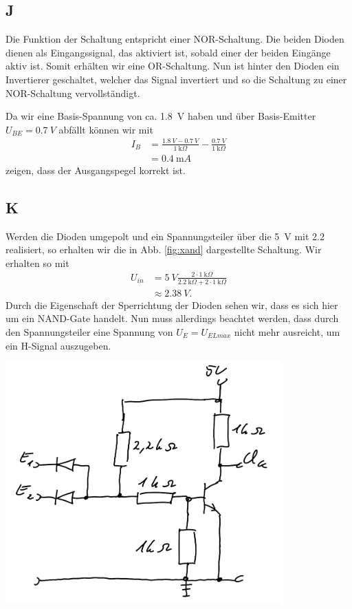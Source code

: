 \documentclass[10pt]{article}
\newenvironment{Figure}
  {\par\medskip\noindent\minipage{\linewidth}}
  {\endminipage\par\medskip}
\begin{document}
\begin{multicols}{2}
	\subsection*{J}
	Die Funktion der Schaltung entspricht einer NOR-Schaltung. Die beiden Dioden dienen als Eingangssignal, das aktiviert ist, sobald einer der beiden Eingänge aktiv ist. Somit erhälten wir eine OR-Schaltung. Nun ist hinter den Dioden ein Invertierer geschaltet, welcher das Signal invertiert und so die Schaltung zu einer NOR-Schaltung vervollständigt.

	Da wir eine Basis-Spannung von ca. \SI{1.8}{V} haben und über Basis-Emitter $U_{BE}=\SI{0.7}{V}$ abfällt können wir mit
	\begin{align}
		I_B & =\frac{\SI{1.8}{V}-\SI{0.7}{V}}{\SI{1}{\kilo\Omega}}-\frac{\SI{0.7}{V}}{\SI{1}{\kilo\Omega}} \\
		    & =\SI{0.4}{\milli A}
	\end{align}
	zeigen, dass der Ausgangspegel korrekt ist.
	\subsection*{K}
	Werden die Dioden umgepolt und ein Spannungsteiler über die \SI{5}{V} mit \SI{2.2}{\kilo \Omega} realisiert, so erhalten wir die in Abb. \ref{fig:xand} dargestellte Schaltung. Wir erhalten so mit
	\begin{align*}
		U_{in} & =\SI{5}{V}\frac{2\cdot\SI{1}{\kilo \Omega}}{\SI{2.2}{\kilo \Omega}+2\cdot\SI{1}{\kilo \Omega}} \\
		       & \approx \SI{2.38}{V}.
	\end{align*}
	Durch die Eigenschaft der Sperrichtung der Dioden sehen wir, dass es sich hier um ein NAND-Gate handelt. Nun muss allerdings beachtet werden, dass durch den Spannungsteiler eine Spannung von $U_E=U_{ELmax}$ nicht mehr ausreicht, um ein H-Signal auszugeben.
	\begin{Figure}
		\centering\includegraphics[width=0.8\textwidth]{K.png}
		\label{fig:xand}
	\end{Figure}

\end{multicols}
\end{document}
